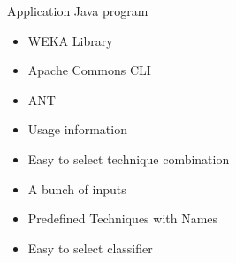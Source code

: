 \begin{frame}{Application}
\bs
\bi
\mi Java program
\begin{itemize}
  \item WEKA Library
  \item Apache Commons CLI
  \item ANT 
  \item Usage information
  \item Easy to select technique combination
  \item A bunch of inputs
  \item Predefined Techniques with Names
  \item Easy to select classifier
\end{itemize}

\ei

\end{frame}
